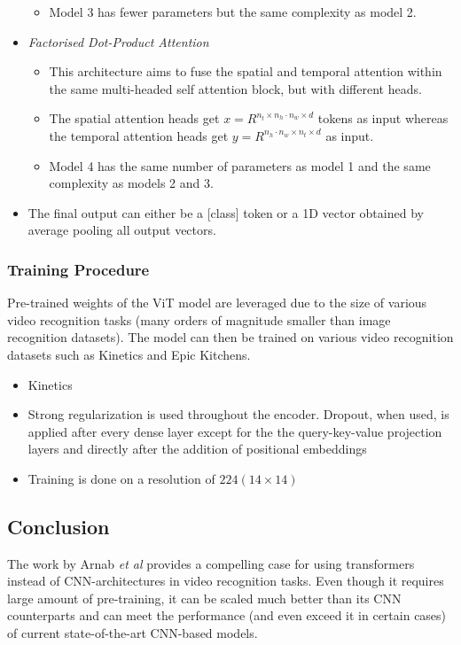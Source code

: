 \begin{itemize}
\begin{itemize}
        \item Model 3 has fewer parameters but the same complexity as model 2.
    \end{itemize}
    \item \textit{Factorised Dot-Product Attention}
    \begin{itemize}
        \item This architecture aims to fuse the spatial and temporal attention within the same multi-headed self attention block, but with different heads.
        \item The spatial attention heads get $x = R^{n_t \times n_h \cdot n_w \times d}$ tokens as input whereas the temporal attention heads get $y = R^{n_h \cdot n_w \times n_t \times d}$ as input.
        \item Model 4 has the same number of parameters as model 1 and the same complexity as models 2 and 3.
    \end{itemize}
    \item The final output can either be a [class] token or a 1D vector obtained by average pooling all output vectors.
\end{itemize}



\subsubsection{Training Procedure}
\par Pre-trained weights of the ViT model are leveraged due to the size of various video recognition tasks (many orders of magnitude smaller than image recognition datasets).
The model can then be trained on various video recognition datasets such as Kinetics and Epic Kitchens.
\begin{itemize}
	\item Kinetics 
	\item Strong regularization is used throughout the encoder. Dropout, when used, is applied after every dense layer except for the the query-key-value projection layers and directly after the addition of positional embeddings
	\item Training is done on a resolution of $224 (14 \times 14)$
\end{itemize}

\subsection{Conclusion}
\par The work by Arnab \textit{et al} provides a compelling case for using transformers instead of CNN-architectures in video recognition tasks. 
Even though it requires large amount of pre-training, it can be scaled much better than its CNN counterparts and can meet the performance (and even exceed it in certain cases) of current state-of-the-art CNN-based models.
